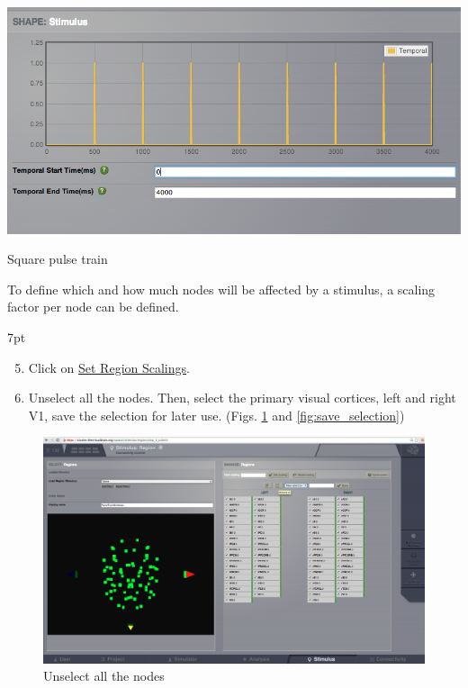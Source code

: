 \documentclass{tufte-handout}
\newenvironment{formal}{%
  \def\FrameCommand{%
    \hspace{1pt}%
    {\color{DarkBlue}\vrule width 2pt}%
    {\color{formalshade}\vrule width 4pt}%
    \colorbox{formalshade}%
  }%
  \MakeFramed{\advance\hsize-\width\FrameRestore}%
  \noindent\hspace{-4.55pt}%
  \begin{adjustwidth}{}{7pt}%
  \vspace{2pt}\vspace{2pt}%
}
{%
  \vspace{2pt}\end{adjustwidth}\endMakeFramed%
}
\begin{document}
\begin{marginfigure}
  \includegraphics[width=\linewidth]{Handout_UI_HeterogenousModelAndStimulation_PulseTrain}%
  \caption{Square pulse train}%
  \label{fig:pulse_train}%
\end{marginfigure}

 To define which and how much nodes will be affected by a stimulus, a scaling factor per node can be defined. 

\begin{formal}
\begin{enumerate}[resume]
\setcounter{enumi}{4}
\item Click on \underline{Set Region Scalings}. 
\item Unselect all the nodes. Then, select the primary visual cortices, left and right V1, save the selection for later use. (Figs. \ref{fig:unselect_nodes} and \ref{fig:save_selection})
\end{enumerate}
\end{formal}

\begin{figure}[h]
  \includegraphics[width=\linewidth]{Handout_UI_HeterogenousModelAndStimulation_StimulusRegionSelectNodes}%
  \caption{Unselect all the nodes}%
  \label{fig:unselect_nodes}%
\end{figure}
\end{document}
